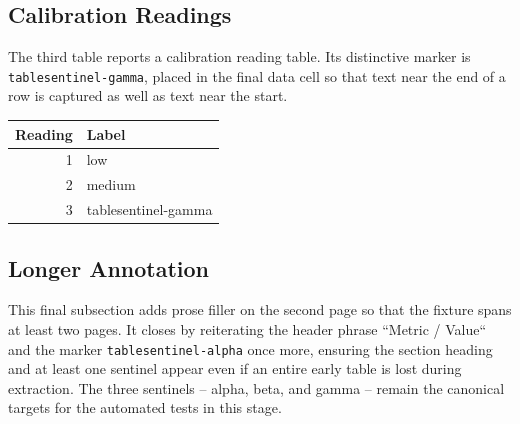 \documentclass{article}
\begin{document}
\subsection{Calibration Readings}
The third table reports a calibration reading table. Its distinctive marker is
\texttt{tablesentinel-gamma}, placed in the final data cell so that text near
the end of a row is captured as well as text near the start.

\begin{center}
\begin{tabular}{|r|l|}
\hline
Reading & Label \\
\hline
1 & low \\
2 & medium \\
3 & tablesentinel-gamma \\
\hline
\end{tabular}
\end{center}

\newpage

\subsection{Longer Annotation}
This final subsection adds prose filler on the second page so that the fixture
spans at least two pages. It closes by reiterating the header phrase ``Metric
/ Value`` and the marker \texttt{tablesentinel-alpha} once more, ensuring the
section heading and at least one sentinel appear even if an entire early table
is lost during extraction. The three sentinels -- alpha, beta, and gamma --
remain the canonical targets for the automated tests in this stage.
\end{document}
